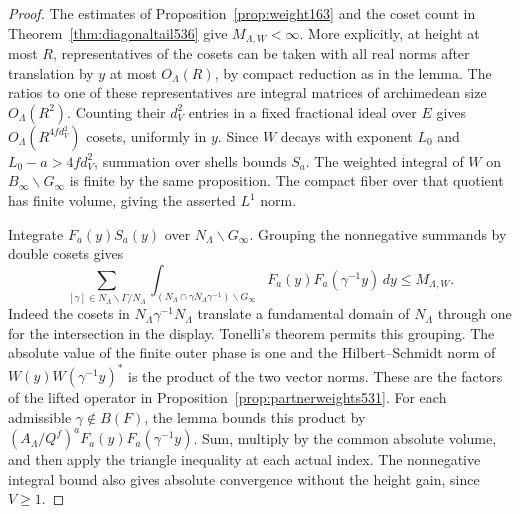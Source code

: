 \documentclass[a4paper,11pt]{article}
\theoremstyle{definition}
\theoremstyle{remark}
\numberwithin{equation}{section}
\begin{document}
\begin{proof}
The estimates of Proposition~\ref{prop:weight163} and the
coset count in Theorem~\ref{thm:diagonaltail536} give
\(M_{\Lambda,W}<\infty\). More explicitly, at height at most
\(R\), representatives of the cosets can be taken with all
real norms after translation by \(y\) at most \(O_\Lambda(R)\),
by compact reduction as in the lemma. The ratios to one of
these representatives are integral matrices of archimedean
size \(O_\Lambda(R^2)\). Counting their \(d_V^2\) entries in a
fixed fractional ideal over \(E\) gives
\(O_\Lambda(R^{4fd_V^2})\) cosets, uniformly in \(y\).
Since \(W\) decays with exponent \(L_0\) and
\(L_0-a>4fd_V^2\), summation over shells bounds \(S_a\).
The weighted integral of \(W\) on \(B_\infty\backslash G_\infty\)
is finite by the same proposition. The compact fiber over that
quotient has finite volume, giving the asserted \(L^1\) norm.

Integrate \(F_a(y)S_a(y)\) over \(N_\Lambda\backslash G_\infty\).
Grouping the nonnegative summands by double cosets gives
\[
 \sum_{[\gamma]\in N_\Lambda\backslash\Gamma/N_\Lambda}
 \int_{(N_\Lambda\cap\gamma N_\Lambda\gamma^{-1})\backslash G_\infty}
             F_a(y)F_a(\gamma^{-1}y)\,dy
           \le M_{\Lambda,W}.
\]
Indeed the cosets in \(N_\Lambda\gamma^{-1}N_\Lambda\) translate
a fundamental domain of \(N_\Lambda\) through one for the
intersection in the display. Tonelli's theorem permits this
grouping. The absolute value of the finite outer phase is one
and the Hilbert--Schmidt norm of \(W(y)W(\gamma^{-1}y)^*\)
is the product of the two vector norms. These are the factors
of the lifted operator in Proposition~\ref{prop:partnerweights531}.
For each admissible \(\gamma\notin B(F)\), the lemma bounds this
product by \((A_\Lambda/Q^f)^a F_a(y)F_a(\gamma^{-1}y)\).
Sum, multiply by the common absolute volume, and then apply the
triangle inequality at each actual index. The nonnegative integral
bound also gives absolute convergence without the height gain,
since \(V\ge1\).
\end{proof}
\end{document}
